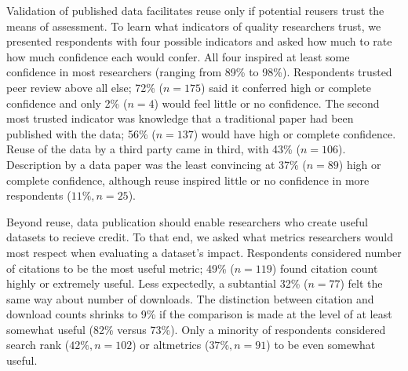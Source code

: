 \documentclass[10pt]{article}
\begin{document}
Validation of published data facilitates reuse only if potential reusers trust the means of assessment.
To learn what indicators of quality researchers trust, we presented respondents with four possible indicators and asked how much to rate how much confidence each would confer.
All four inspired at least some confidence in most researchers (ranging from 89\% to 98\%).
Respondents trusted peer review above all else; 72\% ($n=175$) said it conferred high or complete confidence and only 2\% ($n=4$) would feel little or no confidence.
The second most trusted indicator was knowledge that a traditional paper had been published with the data; 56\% ($n=137$) would have high or complete confidence.
Reuse of the data by a third party came in third, with 43\% ($n=106$). 
Description by a data paper was the least convincing at 37\% ($n=89$) high or complete confidence, although reuse inspired little or no confidence in more respondents ($11\%, n=25$).

Beyond reuse, data publication should enable researchers who create useful datasets to recieve credit.
To that end, we asked what metrics researchers would most respect when evaluating a dataset's impact.
Respondents considered number of citations to be the most useful metric; 49\% ($n=119$) found citation count highly or extremely useful. 
Less expectedly, a subtantial 32\% ($n=77$) felt the same way about number of downloads.
The distinction between citation and download counts shrinks to 9\% if the comparison is made at the level of at least somewhat useful (82\% versus 73\%).
Only a minority of respondents considered search rank ($42\%, n=102$) or altmetrics ($37\%, n=91$) to be even somewhat useful.
\end{document}
